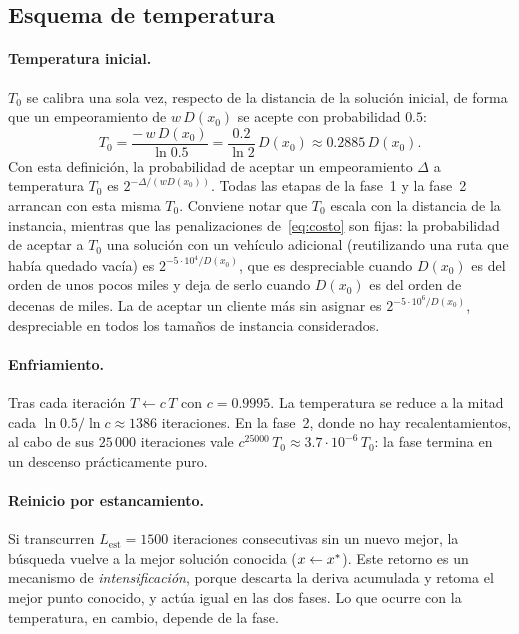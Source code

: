 \subsection{Esquema de temperatura}

\paragraph{Temperatura inicial.} $T_0$ se calibra una sola vez, respecto de la distancia de la
solución inicial, de forma que un empeoramiento de $w\,D(x_0)$ se acepte con probabilidad
$0.5$:
\begin{equation}
T_0=\frac{-\,w\,D(x_0)}{\ln 0.5}=\frac{0.2}{\ln 2}\,D(x_0)\approx 0.2885\,D(x_0).
\label{eq:t0}
\end{equation}
Con esta definición, la probabilidad de aceptar un empeoramiento $\Delta$ a temperatura $T_0$
es $2^{-\Delta/(w D(x_0))}$. Todas las etapas de la fase~1 y la fase~2 arrancan con esta misma
$T_0$. Conviene notar que $T_0$ escala con la distancia de la instancia, mientras que las
penalizaciones de~\eqref{eq:costo} son fijas: la probabilidad de aceptar a $T_0$ una solución
con un vehículo adicional (reutilizando una ruta que había quedado vacía) es
$2^{-5\cdot 10^{4}/D(x_0)}$, que es despreciable cuando $D(x_0)$ es del orden de unos pocos
miles y deja de serlo cuando $D(x_0)$ es del orden de decenas de miles. La de aceptar un
cliente más sin asignar es $2^{-5\cdot 10^{6}/D(x_0)}$, despreciable en todos los tamaños de
instancia considerados.

\paragraph{Enfriamiento.} Tras cada iteración $T\gets c\,T$ con $c=0.9995$. La temperatura
se reduce a la mitad cada $\ln 0.5/\ln c\approx 1386$ iteraciones. En la fase~2, donde no hay
recalentamientos, al cabo de sus $25\,000$ iteraciones vale
$c^{25000}\,T_0\approx 3.7\cdot 10^{-6}\,T_0$: la fase termina en un descenso prácticamente
puro.

\paragraph{Reinicio por estancamiento.} Si transcurren $L_{\mathrm{est}}=1500$ iteraciones
consecutivas sin un nuevo mejor, la búsqueda vuelve a la mejor solución conocida
($x\gets x^{*}$). Este retorno es un mecanismo de \emph{intensificación}, porque descarta la
deriva acumulada y retoma el mejor punto conocido, y actúa igual en las dos fases. Lo que
ocurre con la temperatura, en cambio, depende de la fase.

